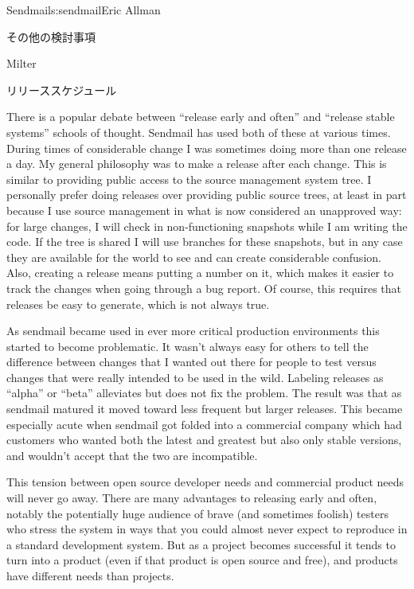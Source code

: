 \begin{aosachapter}{Sendmail}{s:sendmail}{Eric Allman}
\begin{aosasect1}{その他の検討事項}
\begin{aosasect2}{Milter}
\end{aosasect2}

\begin{aosasect2}{リリーススケジュール}

There is a popular debate between ``release early and often'' and
``release stable systems'' schools of thought. Sendmail has used both
of these at various times. During times of considerable change I was
sometimes doing more than one release a day. My general philosophy was
to make a release after each change. This is similar to providing
public access to the source management system tree. I personally
prefer doing releases over providing public source trees, at least in
part because I use source management in what is now considered an
unapproved way: for large changes, I will check in non-functioning
snapshots while I am writing the code. If the tree is shared I will
use branches for these snapshots, but in any case they are available
for the world to see and can create considerable confusion. Also,
creating a release means putting a number on it, which makes it easier
to track the changes when going through a bug report.
Of course, this requires that releases be easy to generate,
which is not always true.

As sendmail became used in ever more critical production environments
this started to become problematic. It wasn't always easy for others
to tell the difference between changes that I wanted out there for
people to test versus changes that were really intended to be used in
the wild. Labeling releases as ``alpha'' or ``beta'' alleviates but
does not fix the problem. The result was that as sendmail matured it
moved toward less frequent but larger releases. This became especially
acute when sendmail got folded into a commercial company which had
customers who wanted both the latest and greatest but also only stable
versions, and wouldn't accept that the two are incompatible.

This tension between open source developer needs and commercial
product needs will never go away. There are many advantages to
releasing early and often, notably the potentially huge audience of
brave (and sometimes foolish) testers who stress the system in ways
that you could almost never expect to reproduce in a standard
development system. But as a project becomes successful it tends to
turn into a product (even if that product is open source and free),
and products have different needs than projects.


\end{aosasect2}
\end{aosasect1}
\end{aosachapter}
